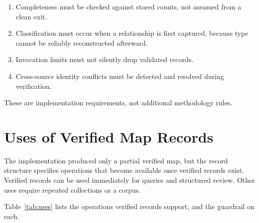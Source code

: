\documentclass[conference]{IEEEtran}
\begin{document}
\begin{enumerate}
  \item Completeness must be checked against stored counts, not assumed from a clean exit.
  \item Classification must occur when a relationship is first captured, because type cannot be reliably reconstructed afterward.
  \item Invocation limits must not silently drop validated records.
  \item Cross-source identity conflicts must be detected and resolved during verification.
\end{enumerate}

These are implementation requirements, not additional methodology rules.


\section{Uses of Verified Map Records}\label{sec:8}

The implementation produced only a partial verified map, but the record structure specifies operations that become available once verified records exist. Verified records can be used immediately for queries and structured review. Other uses require repeated collections or a corpus.

Table~\ref{tab:uses} lists the operations verified records support, and the guardrail on each.
\end{document}
